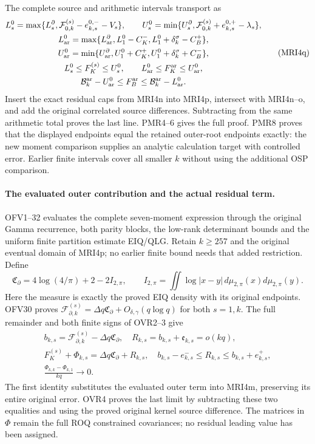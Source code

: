 \documentclass[11pt,a4paper]{article}
\begin{document}
The complete source and arithmetic intervals transport as
\[
 \begin{gathered}
 L_s^0=\max\{L_s^\partial,\mathcal F_{0,k}^{(s)}-e_{k,s}^{0,-}-V_s\},\qquad
 U_s^0=\min\{U_s^\partial,\mathcal F_{0,k}^{(s)}+e_{k,s}^{0,+}-\lambda_s\},\\
 L_{\rm ar}^0=\max\{L_{\rm ar}^\partial,L_1^0-C_K^-,
                                    L_1^0+\delta_k^\sigma-C_B^+\},\\
 U_{\rm ar}^0=\min\{U_{\rm ar}^\partial,U_1^0+C_K^+,
                                    U_1^0+\delta_k^\sigma+C_B^-\},\\
 L_s^0\le F_K^{(s)}\le U_s^0,\qquad
 L_{\rm ar}^0\le F_K^{\rm ar}\le U_{\rm ar}^0,\\
 \mathcal B_k^{\rm ar}-U_{\rm ar}^0
      \le F_B^{\rm ar}\le\mathcal B_k^{\rm ar}-L_{\rm ar}^0.
 \end{gathered}\tag{MRI4q}
\]
Insert the exact residual caps from MRI4n into MRI4p, intersect
with MRI4n--o, and add the original correlated source differences.
Subtracting from the same arithmetic total proves the last line.
PMR4--6 gives the full proof. PMR8 proves that the displayed
endpoints equal the retained outer-root endpoints exactly:
the new moment comparison supplies an analytic calculation
target with controlled error. Earlier finite intervals cover all
smaller $k$ without using the additional OSP comparison.


\paragraph{The evaluated outer contribution and the actual residual term.}
OFV1--32 evaluates the complete seven-moment expression through the
original Gamma recurrence, both parity blocks, the low-rank determinant
bounds and the uniform finite partition estimate EIQ/QLG. Retain
$k\ge257$ and the original eventual domain of MRI4p; no earlier finite
bound needs that added restriction. Define
\[
 \mathfrak C_\partial=4\log(4/\pi)+2-2I_{2,\pi},\qquad
 I_{2,\pi}=\iint\log|x-y|\,d\mu_{2,\pi}(x)d\mu_{2,\pi}(y).
 \tag{MRI4r}
\]
Here the measure is exactly the proved EIQ density with its original
endpoints. OFV30 proves
$\mathcal F_{\partial,k}^{(s)}=\Delta q\mathfrak C_\partial+
O_{\delta,\gamma}(q\log q)$ for both $s=1,k$.
The full remainder and both finite signs of OVR2--3 give
\[
 \begin{gathered}
 b_{k,s}=\mathcal F_{\partial,k}^{(s)}-\Delta q\mathfrak C_\partial,
 \quad R_{k,s}=b_{k,s}+\mathfrak e_{k,s}=o(kq),\\
 F_K^{(s)}+\Phi_{k,s}=\Delta q\mathfrak C_\partial+R_{k,s},
 \quad b_{k,s}-e_{k,s}^-\le R_{k,s}\le b_{k,s}+e_{k,s}^+,\\
 \frac{\Phi_{k,k}-\Phi_{k,1}}{kq}\longrightarrow0.
 \end{gathered}\tag{MRI4s}
\]
The first identity substitutes the evaluated outer term into MRI4m,
preserving its entire original error. OVR4 proves the last limit by
subtracting these two equalities and using the proved original kernel
source difference. The matrices in $\Phi$ remain the full ROQ
constrained covariances; no residual leading value has been assigned.
\end{document}
